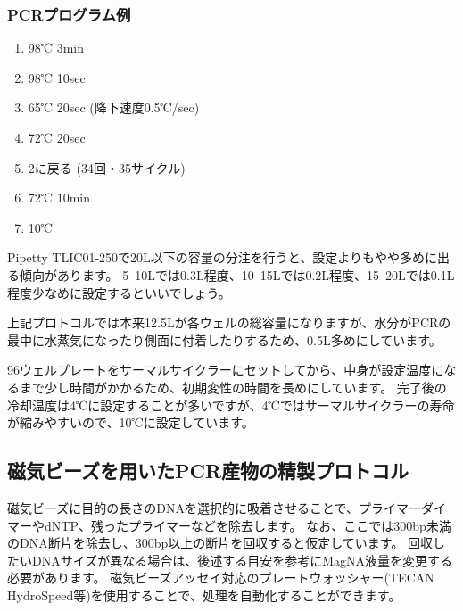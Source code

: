 \documentclass[titlepage,10pt,a4paper,uplatex]{jsbook}
\begin{document}
\subsubsection{PCRプログラム例}
\begin{enumerate}
\item 98℃ 3min
\item 98℃ 10sec
\item 65℃ 20sec (降下速度0.5℃/sec)
\item 72℃ 20sec
\item 2に戻る (34回・35サイクル)
\item 72℃ 10min
\item 10℃
\end{enumerate}

Pipetty TLIC01-250で20{\textmu}L以下の容量の分注を行うと、設定よりもやや多めに出る傾向があります。
5--10{\textmu}Lでは0.3{\textmu}L程度、10--15{\textmu}Lでは0.2{\textmu}L程度、15--20{\textmu}Lでは0.1{\textmu}L程度少なめに設定するといいでしょう。

上記プロトコルでは本来12.5{\textmu}Lが各ウェルの総容量になりますが、水分がPCRの最中に水蒸気になったり側面に付着したりするため、0.5{\textmu}L多めにしています。

96ウェルプレートをサーマルサイクラーにセットしてから、中身が設定温度になるまで少し時間がかかるため、初期変性の時間を長めにしています。
完了後の冷却温度は4℃に設定することが多いですが、4℃ではサーマルサイクラーの寿命が縮みやすいので、10℃に設定しています。

\subsection{磁気ビーズを用いたPCR産物の精製プロトコル}

磁気ビーズに目的の長さのDNAを選択的に吸着させることで、プライマーダイマーやdNTP、残ったプライマーなどを除去します。
なお、ここでは300bp未満のDNA断片を除去し、300bp以上の断片を回収すると仮定しています。
回収したいDNAサイズが異なる場合は、後述する目安を参考にMagNA液量を変更する必要があります。
磁気ビーズアッセイ対応のプレートウォッシャー(TECAN HydroSpeed等)を使用することで、処理を自動化することができます。
\end{document}
